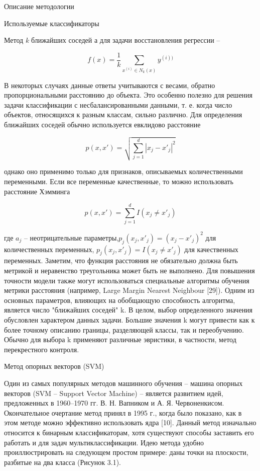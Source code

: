 \begin{section}{Описание методологии}
\begin{subsection}{Используемые классификаторы}
\begin{subsubsection}{Метод \textit{k} ближайших соседей}
      а для задачи восстановления регрессии –

      \begin{equation}
      f(x)=\frac{1}{k} \sum_{x^{(i)} \in N_k(x)}y^{(i))}
     \end{equation}

     В некоторых случаях данные ответы учитываются с весами, обратно пропорциональными расстоянию до объекта. Это особенно полезно для решения задачи классификации с несбалансированными данными, т. е. когда число объектов, относящихся к разным классам, сильно различно.
Для определения ближайших соседей обычно используется евклидово расстояние

    \begin{equation}
      p(x,x') = \sqrt{\sum\limits_{j=1}^d |x_j - x'_j|^2}
    \end{equation}


    однако оно применимо только для признаков, описываемых количественными переменными. Если все переменные качественные, то можно использовать расстояние Хэмминга

    \begin{equation}
      p(x,x') = \sum\limits_{j=1}^d I(x_j \neq x'_j)
    \end{equation}

    где $a_j$ – неотрицательные параметры,$p_j(x_j,x'_j)=(x_j-x'_j)^2$  для количественных переменных, $p_j(x_j,x'_j)=I(x_j \neq x'_j)$  для качественных переменных. Заметим, что функция расстояния не обязательно должна быть метрикой и неравенство треугольника может быть не выполнено.
Для повышения точности модели также могут использоваться специальные алгоритмы обучения метрики расстояния (например, Large Margin Nearest Neighbour [29]).
Одним из основных параметров, влияющих на обобщающую способность алгоритма, является число "ближайших соседей" k. В целом, выбор определенного значения обусловлен характером данных задачи. Большие значения k могут привести как к более точному описанию границы, разделяющей классы, так и переобучению. Обычно для выбора k применяют различные эвристики, в частности, метод перекрестного контроля.

    \end{subsubsection}

    \begin{subsubsection}{Метод опорных векторов (SVM)}

      Один из самых популярных методов машинного обучения – машина опорных векторов (SVM – Support Vector Machine) – является развитием идей, предложенных в 1960–1970 гг. В. Н. Вапником и А. Я. Червоненкисом. Окончательное очертание метод принял в 1995 г., когда было показано, как в этом методе можно эффективно использовать ядра [10].
Данный метод изначально относится к бинарным классификаторам, хотя существуют способы заставить его работать и для задач мультиклассификации.
Идею метода удобно проиллюстрировать на следующем простом примере: даны точки на плоскости, разбитые на два класса (Рисунок 3.1).


\end{subsubsection}
\end{subsection}
\end{section}

